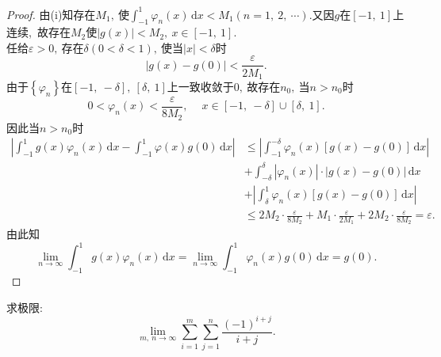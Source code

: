 	\begin{proof}
		由(i)知存在$M_1,\ $使$\int_{-1}^{1}\varphi_n(x)\,\text{d}x<M_1(n=1,\ 2,\ \cdots).$又因$g$在$\left[-1,\ 1\right]$上连续,\ 故存在$M_2$使$|g(x)|<M_2,\ x\in\left[-1,\ 1\right].$\\
		任给$\varepsilon>0,\ $存在$\delta(0<\delta<1),\ $使当$|x|<\delta$时
		$$\left|g(x)-g(0)\right|<\frac{\varepsilon}{2M_1}.$$
		由于$\left\{\varphi_n\right\}$在$\left[-1,\ -\delta\right],\ \left[\delta,\ 1\right]$上一致收敛于$0,\ $故存在$n_0,\ $当$n>n_0$时
		$$0<\varphi_n(x)<\frac{\varepsilon}{8M_2},\ \quad x\in\left[-1,\ -\delta\right]\cup\left[\delta,\ 1\right].$$
		因此当$n>n_0$时
		\begin{align*}
			\left|\int_{-1}^{1}g(x)\varphi_n(x)\,\text{d}x-\int_{-1}^{1}\varphi(x)g(0)\,\text{d}x\right|&\le\left|\int_{-1}^{-\delta}\varphi_n(x)\left[g(x)-g(0)\right]\,\text{d}x\right|\\
			&+\int_{-\delta}^{\delta}|\varphi_n(x)|\cdot|g(x)-g(0)|\,\text{d}x\\
			&+\left|\int_{\delta}^{1}\varphi_n(x)\left[g(x)-g(0)\right]\,\text{d}x\right|\\
			&\le2M_2\cdot\frac{\varepsilon}{8M_2}+M_1\cdot\frac{\varepsilon}{2M_1}+2M_2\cdot\frac{\varepsilon}{8M_2}=\varepsilon.
		\end{align*}
		由此知
		$$\lim\limits_{n\rightarrow\infty}\int_{-1}^{1}g(x)\varphi_n(x)\,\text{d}x=\lim\limits_{n\rightarrow\infty}\int_{-1}^{1}\varphi_n(x)g(0)\,\text{d}x=g(0).$$ 
	\end{proof}
	\newpage
	\begin{problem}
		求极限:
		$$\lim\limits_{m,\ n\rightarrow\infty}\sum\limits_{i=1}^{m}\sum\limits_{j=1}^{n}\frac{(-1)^{i+j}}{i+j}.$$
	\end{problem}
	
